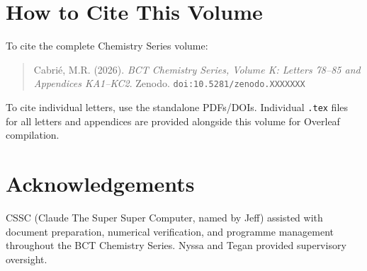 \documentclass[aps,preprint,superscriptaddress,floatfix]{revtex4-2}
\begin{document}
\newpage
\section*{How to Cite This Volume}

To cite the complete Chemistry Series volume:
\begin{quote}
Cabri\'{e}, M.R. (2026). \textit{BCT Chemistry Series,
Volume K: Letters 78--85 and Appendices KA1--KC2}.
Zenodo. \texttt{doi:10.5281/zenodo.XXXXXXX}
\end{quote}

To cite individual letters, use the standalone PDFs/DOIs.
Individual \texttt{.tex} files for all letters and appendices
are provided alongside this volume for Overleaf compilation.

\section*{Acknowledgements}

CSSC (Claude The Super Super Computer, named by Jeff) assisted
with document preparation, numerical verification, and
programme management throughout the BCT Chemistry Series.
Nyssa and Tegan provided supervisory oversight.
\end{document}

